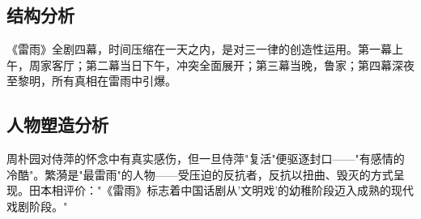 \subsection{结构分析}

《雷雨》全剧四幕，时间压缩在一天之内，是对三一律的创造性运用\cite{cao:thunder}。第一幕上午，周家客厅；第二幕当日下午，冲突全面展开；第三幕当晚，鲁家；第四幕深夜至黎明，所有真相在雷雨中引爆。

\subsection{人物塑造分析}

周朴园对侍萍的怀念中有真实感伤，但一旦侍萍"复活"便驱逐封口——"有感情的冷酷"\cite{cao:thunder}。繁漪是"最雷雨"的人物——受压迫的反抗者，反抗以扭曲、毁灭的方式呈现。田本相评价："《雷雨》标志着中国话剧从'文明戏'的幼稚阶段迈入成熟的现代戏剧阶段。"\cite{tian:history}